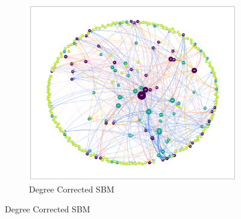 \begin{figure}
    \centering
    \begin{subfigure}{0.5\textheight}
        \centering
        \includegraphics[width=\textwidth]{pics/full_y19_p06_force_146_dc.png}
        \caption{Degree Corrected SBM}
        \label{fig:gasnetworkdc}
    \end{subfigure}


\end{figure}
